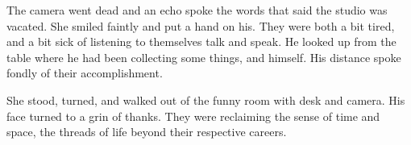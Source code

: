 

The camera went dead and an echo spoke the words that said the studio
was vacated.  She smiled faintly and put a hand on his.  They were
both a bit tired, and a bit sick of listening to themselves talk and
speak.  He looked up from the table where he had been collecting some
things, and himself.  His distance spoke fondly of their
accomplishment.

She stood, turned, and walked out of the funny room with desk and
camera.  His face turned to a grin of thanks.  They were reclaiming
the sense of time and space, the threads of life beyond their
respective careers.

\bye
